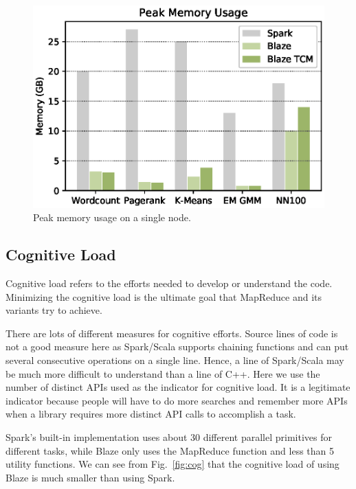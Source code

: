 \begin{figure}
  \begin{center}
  \includegraphics[width=0.7\linewidth]{figs/memory.eps}
  \end{center}
  \vspace{-0.5cm}
  \caption{Peak memory usage on a single node.
  }
  \label{fig:mem}
\end{figure}

\subsection{Cognitive Load}

Cognitive load refers to the efforts needed to develop or understand the code.
Minimizing the cognitive load is the ultimate goal that MapReduce and its variants try to achieve.

There are lots of different measures for cognitive efforts.
Source lines of code is not a good measure here as Spark/Scala supports chaining functions and can put several consecutive operations on a single line.
Hence, a line of Spark/Scala may be much more difficult to understand than a line of C++.
Here we use the number of distinct APIs used as the indicator for cognitive load.
It is a legitimate indicator because people will have to do more searches and remember more APIs when a library requires more distinct API calls to accomplish a task.

Spark's built-in implementation uses about 30 different parallel primitives for different tasks, while Blaze only uses the MapReduce function and less than 5 utility functions.
We can see from Fig.~\ref{fig:cog} that the cognitive load of using Blaze is much smaller than using Spark.

